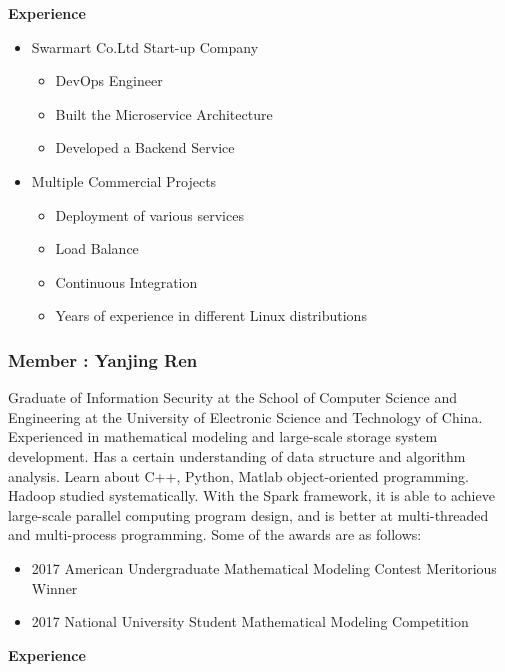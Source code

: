 \documentclass{mcmthesis}
\begin{document}
\textbf{Experience}

\begin{itemize}
	\item Swarmart Co.Ltd Start-up Company
	\begin{itemize}
		\item  DevOps Engineer
		\item Built the Microservice Architecture 
		\item Developed a Backend Service
	\end{itemize}
	\item Multiple Commercial Projects
	\begin{itemize}
		\item Deployment of various services
		\item Load Balance
		\item Continuous Integration
		\item Years of experience in different Linux distributions
	\end{itemize}
\end{itemize}
    
\subsubsection*{\textbf{Member} : Yanjing Ren}
\par Graduate of Information Security at the School of Computer Science and Engineering at the University of Electronic Science and Technology of China. Experienced in mathematical modeling and large-scale storage system development. Has a certain understanding of data structure and algorithm analysis. Learn about C++, Python, Matlab object-oriented programming. Hadoop studied systematically. With the Spark framework, it is able to achieve large-scale parallel computing program design, and is better at multi-threaded and multi-process programming. Some of the awards are as follows:

\begin{itemize}
	\item 2017 American Undergraduate Mathematical Modeling Contest Meritorious Winner
	\item 2017 National University Student Mathematical Modeling Competition
\end{itemize}

\textbf{Experience}
\end{document}
